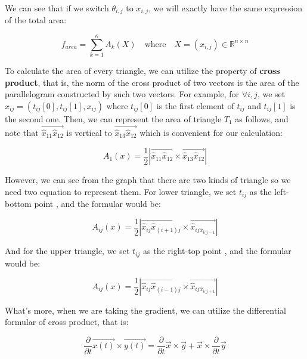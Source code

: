 We can see that if we switch $\theta_{i,j}$ to $x_{i,j}$, we will exactly have the same expression of the total area:

\begin{equation}
    f_{area} = \sum\limits^{\kappa}_{k=1}A_{k}(X) \quad \text{where} \quad X=\left(x_{i, j}\right) \in \mathbb{R}^{n \times n}
\end{equation}

To calculate the area of every triangle, we can utilize the property of \textbf{cross product}, that is, the norm of the cross product of two vectors is the area of the parallelogram constructed by such two vectors. For example, for $\forall i, j$, we set $\hat{x}_{ij}=(t_{ij}[0], t_{ij}[1], x_{ij})$ where $t_{ij}[0]$ is the first element of $t_{ij}$ and $t_{ij}[1]$ is the second one. Then, we can represent the area of triangle $T_1$ as follows, and note that $\overrightarrow{\hat{x}_{11}\hat{x}_{12}}$ is vertical to $\overrightarrow{\hat{x}_{13}\hat{x}_{12}}$ which is convenient for our calculation:

\begin{equation}
    A_1(x) = \frac{1}{2}|\overrightarrow{\hat{x}_{11}\hat{x}_{12}} \times \overrightarrow{\hat{x}_{13}\hat{x}_{12}}|
\end{equation}

However, we can see from the graph that there are two kinds of triangle so we need two equation to represent them. For lower triangle, we set $t_{ij}$ as the left-bottom point , and the formular would be:

\begin{equation}
    A_{ij}(x) = \frac{1}{2}|\overrightarrow{\hat{x}_{ij}\hat{x}_{(i+1)j}} \times \overrightarrow{\hat{x}_{ij\hat{x}_{i(j-1}}}|
\end{equation}

And for the upper triangle, we set $t_{ij}$ as the right-top point , and the formular would be:

\begin{equation}
    A_{ij}(x) = \frac{1}{2}|\overrightarrow{\hat{x}_{ij}\hat{x}_{(i-1)j}} \times \overrightarrow{\hat{x}_{ij\hat{x}_{i(j+1}}}|
\end{equation}

What's more, when we are taking the gradient, we can utilize the differential formular of cross product, that is:

\begin{equation}
    \frac{\partial}{\partial t} \vec{x(t)} \times \vec{y(t)} = \frac{\partial}{\partial t} \vec{x} \times \vec{y} + \vec{x} \times \frac{\partial}{\partial t} \vec{y}
\end{equation}

